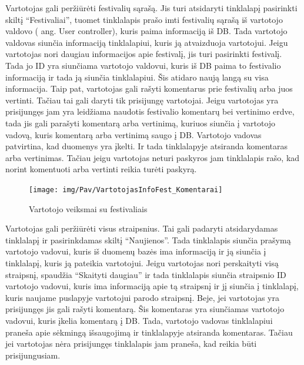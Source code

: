 ﻿\documentclass{VUMIFPSkursinis}
\begin{document}
Vartotojas gali peržiūrėti festivalių sąrašą. Jis turi atsidaryti tinklalapį pasirinkti skiltį “Festivaliai”, tuomet tinklalapis prašo imti festivalių sąrašą iš vartotojo valdovo ( ang. User controller), kuris paima informaciją iš DB. Tada vartotojo valdovas siunčia informaciją tinklalapiui, kuris ją atvaizduoja vartotojui.
Jeigu vartotojas nori daugiau informacijos apie festivalį, jis turi pasirinkti festivalį. Tada jo ID yra siunčiama vartotojo valdovui, kuris iš DB paima to festivalio informaciją ir tada ją siunčia tinklalapiui. Šis atidaro naują langą su visa informacija. Taip pat, vartotojas gali rašyti komentarus  prie festivalių arba juos vertinti. Tačiau tai gali daryti tik prisijungę vartotojai. Jeigu vartotojas yra prisijungęs jam yra leidžiama naudotis festivalio komentarų bei vertinimo erdve, tada jis gali parašyti komentarą arba vertinimą, kuriuos siunčia į vartotojo vadovą, kuris komentarą arba vertinimą saugo į DB. Vartotojo vadovas patvirtina, kad duomenys yra įkelti. Ir tada tinklalapyje atsiranda komentaras arba vertinimas. Tačiau jeigu vartotojas neturi paskyros jam tinklalapis rašo, kad norint komentuoti arba vertinti reikia turėti paskyrą.

\begin{figure}[H]
    \centering
    \texttt{[image: img/Pav/VartotojasInfoFest\_Komentarai]}
    \label{img:uml4}
	\caption{Vartotojo veiksmai su festivaliais}
\end{figure}

Vartotojas gali peržiūrėti visus straipsnius. Tai gali padaryti atsidarydamas tinklalapį ir pasirinkdamas skiltį “Naujienos”. Tada tinklalapis siunčia prašymą vartotojo vadovui, kuris iš duomenų bazės ima informaciją ir ją siunčia į tinklalapį, kuris ją pateikia vartotojui. Jeigu vartotojas nori perskaityti visą straipsnį, spaudžia “Skaityti daugiau” ir tada tinklalapis siunčia straipsnio ID vartotojo vadovui, kuris ima informaciją apie tą straipsnį ir jį siunčia į tinklalapį, kuris naujame puslapyje vartotojui parodo straipsnį.
	Beje, jei vartotojas yra prisijungęs jis gali rašyti komentarą. Šis komentaras yra siunčiamas vartotojo vadovui, kuris įkelia komentarą į DB. Tada, vartotojo vadovas tinklalapiui praneša apie sėkmingą išsaugojimą ir tinklalapyje atsiranda komentaras. Tačiau jei vartotojas nėra prisijungęs tinklalapis jam praneša, kad reikia būti prisijungusiam.
\end{document}
